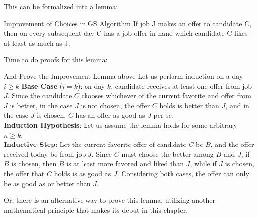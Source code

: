 This can be formalized into a lemma:
\begin{ln-lemma}{Improvement of Choices in GS Algorithm}{}
    If job J makes an offer to candidate C, then on every subsequent day C has a job offer in hand which candidate C likes at least as much as J.
\end{ln-lemma}
Time to do proofs for this lemma:
\begin{ln-think}{And Prove the Improvement Lemma above}{}
    Let us perform induction on a day $i \geq k$
    \tcblower
    \textbf{Base Case} ($i = k$): on day $k$, candidate receives at least one offer from job $J$. Since the candidate $C$ chooses whichever of the current favorite and offer from $J$ is better, in the case $J$ is not chosen, the offer $C$ holds is better than $J$, and in the case $J$ is chosen, $C$ has an offer as good as $J$ per se. \\
    \textbf{Induction Hypothesis}: Let us assume the lemma holds for some arbitrary $n \geq k$. \\
    \textbf{Inductive Step}: Let the current favorite offer of candidate $C$ be $B$, and the offer received today be from job $J$. Since $C$ must choose the better among $B$ and $J$, if $B$ is chosen, then $B$ is at least more favored and liked than $J$, while if $J$ is chosen, the offer that $C$ holds is as good as $J$. Considering both cases, the offer can only be as good as or better than $J$.
\end{ln-think}
Or, there is an alternative way to prove this lemma, utilizing another mathematical principle that makes its debut in this chapter.

